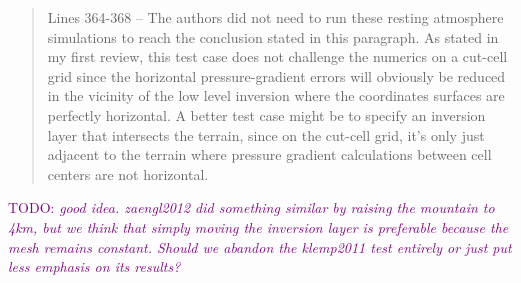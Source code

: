 \documentclass{article}
\newcommand{\TODO}[1]{\textcolor{purple}{TODO: \emph{#1}}}
\begin{document}
\begin{quotation}
 Lines 364-368 – The authors did not need to run these resting atmosphere 
 simulations to reach the conclusion stated in this paragraph. As stated in my first 
 review, this test case does not challenge the numerics on a cut-cell grid since the horizontal pressure-gradient errors will obviously be reduced in the vicinity of the 
 low level inversion where the coordinates surfaces are perfectly horizontal. A better 
 test case might be to specify an inversion layer that intersects the terrain, since on 
 the cut-cell grid, it's only just adjacent to the terrain where pressure gradient 
 calculations between cell centers are not horizontal.   
\end{quotation}
\TODO{good idea.  zaengl2012 did something similar by raising the mountain to 4km, but we think that simply moving the inversion layer is preferable because the mesh remains constant.  Should we abandon the klemp2011 test entirely or just put less emphasis on its results?}
\end{document}
